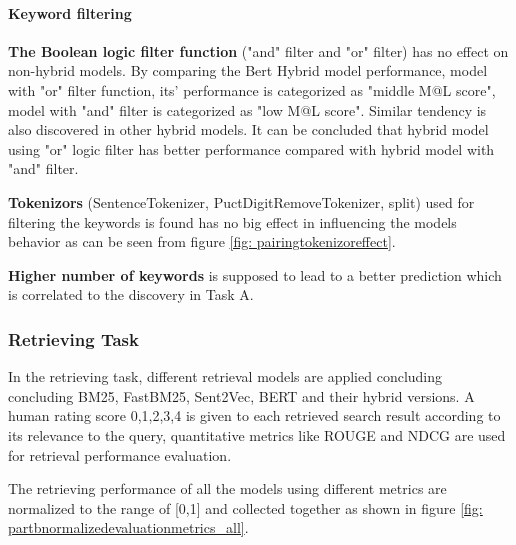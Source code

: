 \documentclass[10pt,a4paper,fleqn]{report}
\begin{document}
			\paragraph{Keyword filtering} %
			
				\textbf{The Boolean logic filter function} ("and" filter and "or" filter) has no effect on non-hybrid models.
				By comparing the Bert Hybrid model performance, model with "or" filter function, its' performance is categorized as "middle M@L score", model with "and" filter is categorized as "low M@L score". Similar tendency is also discovered in other hybrid models. It can be concluded that hybrid model using "or" logic filter has better performance compared with hybrid model with "and" filter.
				
				\textbf{Tokenizors} (SentenceTokenizer,  PuctDigitRemoveTokenizer, split) used for filtering the keywords is found has no big effect in influencing the models behavior as can be seen from figure \ref{fig: pairingtokenizoreffect}.
				
				\textbf{Higher number of keywords} is supposed to lead to a better prediction which is correlated to the discovery in Task A.
				
			
		\subsubsection{Retrieving Task}
			In the retrieving task, different retrieval models are applied concluding concluding BM25, FastBM25, Sent2Vec, BERT and their hybrid versions.
			A human rating score {0,1,2,3,4} is given to each retrieved search result according to its relevance to the query, quantitative metrics like ROUGE and NDCG are used for retrieval performance evaluation.
			
			The retrieving performance of all the models using different metrics are normalized to the range of [0,1] and collected together as shown in figure \ref{fig: partbnormalizedevaluationmetrics_all}.
			
\end{document}
